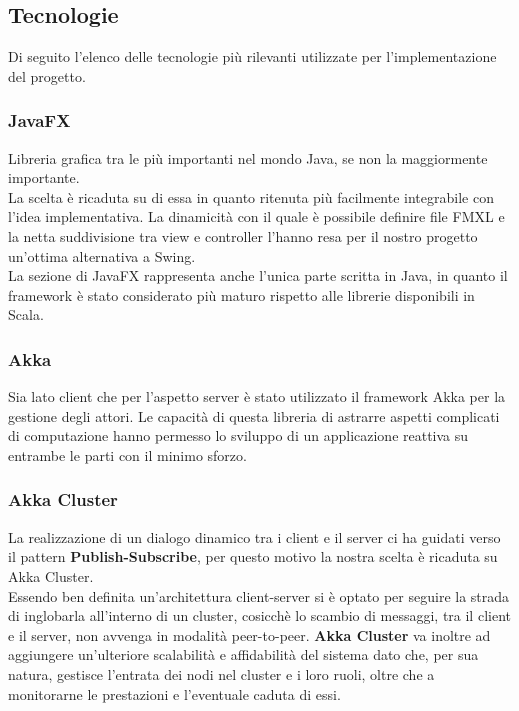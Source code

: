             


        \subsection{Tecnologie}\label{subsec:technologies}
        Di seguito l'elenco delle tecnologie più rilevanti utilizzate per l'implementazione del progetto.
	  \subsubsection{JavaFX}\label{subsub:tecnologie:javafx}
	    Libreria grafica tra le più importanti nel mondo Java, se non la maggiormente importante. 
	    \\
	    La scelta è ricaduta su di essa in quanto ritenuta più facilmente integrabile con l'idea implementativa. 
	    La dinamicità con il quale è possibile definire file FMXL e la netta suddivisione tra view e controller l'hanno resa per il nostro progetto un'ottima alternativa a Swing. \\
	    La sezione di JavaFX rappresenta anche l'unica parte scritta in Java, in quanto il framework è stato considerato più maturo rispetto alle librerie disponibili in Scala.
	    
	 \subsubsection{Akka}\label{subsub:tecnologie:akka}
	   Sia lato client che per l'aspetto server è stato utilizzato il framework Akka per la gestione degli attori. 
	   Le capacità di questa libreria di astrarre aspetti complicati di computazione hanno permesso lo sviluppo di un applicazione reattiva su entrambe le parti con il minimo sforzo. 
	   
	 
	 \subsubsection{Akka Cluster}\label{subsub:tecnologie:akkacluster}
	   La realizzazione di un dialogo dinamico tra i client e il server ci ha guidati verso il pattern \textbf{Publish-Subscribe}, per questo motivo la nostra scelta è ricaduta su Akka Cluster. 
	   \\
	   Essendo ben definita un'architettura client-server si è optato per seguire la strada di inglobarla all'interno di un cluster, cosicchè lo scambio di messaggi, tra il client e il server, non avvenga in modalità peer-to-peer.
	   \textbf{Akka Cluster} va inoltre ad aggiungere un'ulteriore scalabilità e affidabilità del sistema dato che, per sua natura, gestisce l'entrata dei nodi nel cluster e i loro ruoli, oltre che a monitorarne le prestazioni e l'eventuale caduta di essi. 
